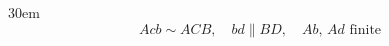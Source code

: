 \documentclass[border=4pt]{standalone}
\begin{document}
\begin{varwidth}{30em}
\large
\[ Acb \sim ACB,\quad bd \parallel BD,\quad Ab,\,Ad \text{ finite} \]

\end{varwidth}
\end{document}
